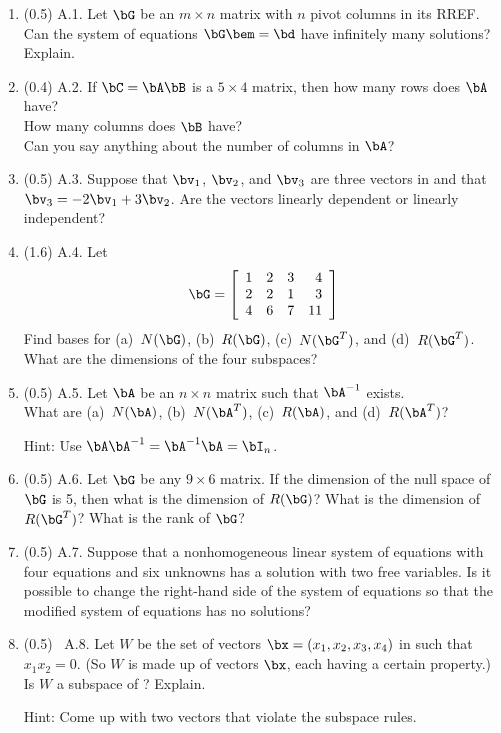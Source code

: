 \documentclass[11pt,titlepage,fleqn]{article}
\begin{document}
\begin{enumerate}
\item (0.5) A.1. Let $\bG$ be an $m \times n$ matrix with $n$ pivot columns in its RREF. \\
Can the system of equations $\bG\bem=\bd$ have infinitely many solutions? Explain.

\item (0.4) A.2. If $\bC = \bA\bB$ is a $5 \times 4$ matrix, then how many rows does $\bA$ have? \\
How many columns does $\bB$ have? \\
Can you say anything about the number of columns in $\bA$?

\item (0.5) A.3. Suppose that $\bv_1$, $\bv_2$, and $\bv_3$ are three vectors in  and that $\bv_3 = -2\bv_1 + 3\bv_2$. Are the vectors linearly dependent or linearly independent?

\item (1.6) A.4. Let
%
\begin{equation*}
\bG =  \left[ \begin{array}{rrrr}
     1  &   2  &   3 & 4 \\
     2  &   2  &   1 & 3 \\
     4  &   6  &   7 & 11 \\
\end{array} \right]
\end{equation*}
%
Find bases for (a)~$N(\bG)$, (b)~$R(\bG)$, (c)~$N(\bG^T)$, and (d)~$R(\bG^T)$. \\
What are the dimensions of the four subspaces?

\item (0.5) A.5. Let $\bA$ be an $n \times n$ matrix such that $\bA^{-1}$ exists. \\
What are (a)~$N(\bA)$, (b)~$N(\bA^T)$, (c)~$R(\bA)$, and (d)~$R(\bA^T)$?

Hint: Use $\bA\bA^{-1} = \bA^{-1}\bA = \bI_n$.

\item (0.5) A.6. Let $\bG$ be any $9 \times 6$ matrix. If the dimension of the null space of $\bG$ is 5, then what is the dimension of $R(\bG)$? What is the dimension of $R(\bG^T)$? What is the rank of $\bG$?

\item (0.5) A.7. Suppose that a nonhomogeneous linear system of equations with four equations and six unknowns has a solution with two free variables. Is it possible to change the right-hand side of the system of equations so that the modified system of equations has no solutions?

\item (0.5) \ptag\ A.8. Let $W$ be the set of vectors $\bx = (x_1,x_2,x_3,x_4)$ in  such that $x_1 x_2 = 0$. (So $W$ is made up of vectors $\bx$, each having a certain property.) Is $W$ a subspace of ? Explain.

Hint: Come up with two vectors that violate the subspace rules.
\end{enumerate}
\end{document}
